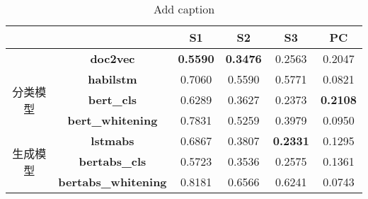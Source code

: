 \documentclass[11pt]{article}
\begin{document}
\begin{CJK}{UTF8}{gkai}
\begin{table}[htbp]\small
  \centering
  \begin{tabular}{c|c|cccc}
    \hline
    \multicolumn{2}{c|}{} & \textbf{S1} & \textbf{S2} & \textbf{S3} & \textbf{PC} \\
    \hline
    & \textbf{doc2vec} & \textcolor[rgb]{ 1,  0,  0}{\textbf{0.5590 }} & \textcolor[rgb]{ 1,  0,  0}{\textbf{0.3476 }} & 0.2563  & 0.2047  \\
    \multirow{3}[0]{*}{分类模型} & \textbf{habilstm} & 0.7060  & 0.5590  & 0.5771  & 0.0821  \\
    & \textbf{bert\_cls} & 0.6289  & 0.3627  & 0.2373  & \textcolor[rgb]{ 1,  0,  0}{\textbf{0.2108 }} \\
    & \textbf{bert\_whitening} & 0.7831  & 0.5259  & 0.3979  & 0.0950  \\
    \hline
    \multirow{3}[0]{*}{生成模型} & \textbf{lstmabs} & 0.6867  & 0.3807  & \textcolor[rgb]{ 1,  0,  0}{\textbf{0.2331 }} & 0.1295  \\
    & \textbf{bertabs\_cls} & 0.5723  & 0.3536  & 0.2575  & 0.1361  \\
    & \textbf{bertabs\_whitening} & 0.8181  & 0.6566  & 0.6241  & 0.0743  \\
    \hline
  \end{tabular}%
  \caption{Add caption}
  \label{tab:addlabel}%
\end{table}%




%
%
%

\end{CJK}
\end{document}
